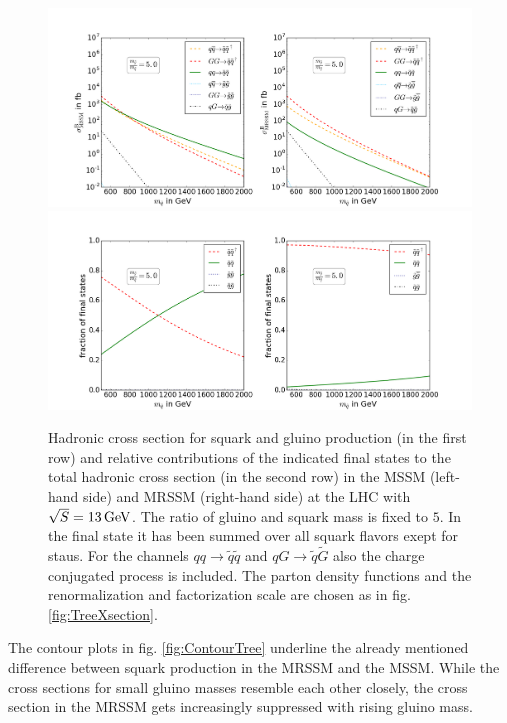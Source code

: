 \begin{figure}[!htpb]
\begin{center}
\includegraphics[scale=.4]{figures/mr=5_MSSM+MRSSM}
\includegraphics[scale=.4]{figures/rel_weights_mr=5_MSSM+MRSSM}
\caption{Hadronic cross section for squark and gluino production (in the first row) and relative contributions of the indicated final states to the total hadronic cross section (in the second row) in the MSSM (left-hand side) and MRSSM (right-hand side) at the LHC with $\sqrt{S} = \unit[13]{GeV}$. The ratio of gluino and squark mass is fixed to $5$. In the final state it has been summed over all squark flavors exept for staus. For the channels $qq \to \tilde{q}\tilde{q}$ and $qG \to \tilde{q}\tilde{G}$ also the charge conjugated process is included. The parton density functions and the renormalization and factorization scale are chosen as in fig. \ref{fig:TreeXsection}.}\label{fig:TreeXsection5}
\end{center}
\end{figure}
\newpage
The contour plots in fig. \ref{fig:ContourTree} underline the already mentioned difference between squark production in the MRSSM and the MSSM. While the cross sections for small gluino masses resemble each other closely, the cross section in the MRSSM gets increasingly suppressed with rising gluino mass. 
